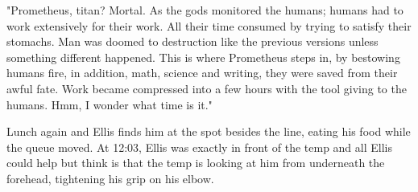\begin{Document}
        "Prometheus, titan? Mortal. As the gods monitored the humans; humans had to work extensively for their work. All their time consumed by trying to satisfy
    their stomachs. Man was doomed to destruction like the previous versions unless something different happened. This is where Prometheus steps in, by bestowing
    humans fire, in addition, math, science and writing, they were saved from their awful fate. Work became compressed into a few hours with the tool giving
    to the humans. Hmm, I wonder what time is it." 

        Lunch again and Ellis finds him at the spot besides the line, eating his food while the queue moved. At 12:03, Ellis was exactly in front of the temp and
    all Ellis could help but think is that the temp is looking at him from underneath the forehead, tightening his grip on his elbow.
\end{Document}

